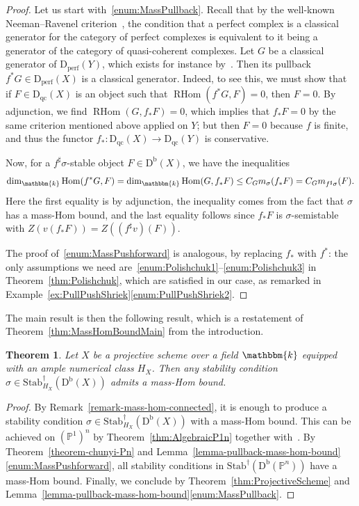 \documentclass[11pt, reqno]{amsart}
\numberwithin{equation}{section}
\theoremstyle{plain}
\newtheorem{theorem}{Theorem}[section]
\theoremstyle{remark}
\theoremstyle{definition}
\theoremstyle{italicsname}
\newcommand{\Db}{\mathrm{D^b}}
\newcommand{\Dperf}{\mathrm{D}_{\mathrm{perf}}}
\newcommand{\Dqc}{\mathrm{D}_{\mathrm{qc}}}
\newcommand{\Stabdagger}{\mathrm{Stab}^\dagger}
\DeclareMathOperator{\RHom}{RHom}
\DeclareMathOperator{\Hom}{Hom}
\newcommand{\KK}{\mathbbm{k}}
\def\PP{\ensuremath{\mathbb{P}}}
\def\citestacks#1{\cite[\href{https://stacks.math.columbia.edu/tag/#1}{#1}]{stacks-project}}
\begin{document}
\begin{proof}
Let us start with~\ref{enum:MassPullback}.
Recall that by the well-known Neeman--Ravenel criterion~\citestacks{09SR}, the condition that a perfect complex is a classical generator for the category of perfect complexes is equivalent to it being a generator of the category of quasi-coherent complexes.
Let $G$ be a classical generator of $\Dperf(Y)$, which exists for instance by~\cite[Proposition 2.5]{neeman-Grothendieck-duality}. 
Then its pullback $f^*G \in \Dperf(X)$ is a classical generator. 
Indeed, to see this, we must show that if $F \in \Dqc(X)$ is an object such that $\RHom(f^*G, F) = 0$, then $F = 0$. 
By adjunction, we find $\RHom(G, f_*F) = 0$, which implies that $f_*F = 0$ by the same criterion mentioned above applied on $Y$; but then $F = 0$ because $f$ is finite, and thus the functor $f_* \colon \Dqc(X) \to \Dqc(Y)$ is conservative.

Now, for a $f^\sharp\sigma$-stable object $F\in\Db(X)$, we have the inequalities
\[
\dim_\KK \Hom(f^*G, F) = \dim_\KK \Hom(G, f_*F) \leq C_G m_{\sigma}(f_*F) = C_G m_{f^\sharp\sigma}(F).
\]
Here the first equality is by adjunction, the inequality comes from the fact that $\sigma$ has a mass-Hom bound, and the last equality follows since $f_*F$ is $\sigma$-semistable with $Z(v(f_*F))=Z((f^\sharp v)(F))$.

The proof of~\ref{enum:MassPushforward} is analogous, by replacing $f_*$ with $f^*$: the only assumptions we need are~\ref{enum:Polishchuk1}--\ref{enum:Polishchuk3} in Theorem~\ref{thm:Polishchuk}, which are satisfied in our case, as remarked in Example~\ref{ex:PullPushShriek}\ref{enum:PullPushShriek2}.
\end{proof}

The main result is then the following result, which is a restatement of Theorem~\ref{thm:MassHomBoundMain} from the introduction. 

\begin{theorem}\label{thm:MassHomBoundProjective}
Let $X$ be a projective scheme over a field $\KK$ equipped with an ample numerical class $H_X$.  
Then any stability condition $\sigma \in \Stabdagger_{H_X}(\Db(X))$ admits a mass-Hom bound.
\end{theorem}

\begin{proof}
By Remark~\ref{remark-mass-hom-connected}, it is enough to produce a stability condition $\sigma\in\Stabdagger_{H_X}(\Db(X))$ with a mass-Hom bound. 
This can be achieved on $(\PP^1)^n$ by Theorem~\ref{thm:AlgebraicP1n} together with~\cite[Example 2.9]{DHL-robotis}. 
By Theorem~\ref{theorem-chunyi-Pn} and Lemma~\ref{lemma-pullback-mass-hom-bound}\ref{enum:MassPushforward}, all stability conditions in $\Stabdagger(\Db(\PP^n))$ have a mass-Hom bound.
Finally, we conclude by Theorem~\ref{thm:ProjectiveScheme} and Lemma~\ref{lemma-pullback-mass-hom-bound}\ref{enum:MassPullback}.
\end{proof}
\end{document}
